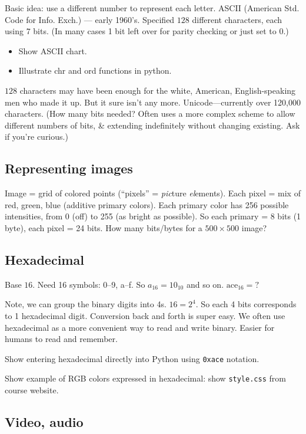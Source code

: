 \documentclass{article}
\begin{document}
Basic idea: use a different number to represent each letter.  ASCII
(American Std. Code for Info. Exch.) --- early 1960's.  Specified
$128$ different characters, each using $7$ bits.  (In many cases 1 bit
left over for parity checking or just set to $0$.)
\begin{itemize}
\item Show ASCII chart.
\item Illustrate chr and ord functions in python.
\end{itemize}
$128$ characters may have been enough for the white, American,
English-speaking men who made it up.  But it sure isn't any more.
Unicode---currently over 120,000 characters. (How many bits needed?
Often uses a more complex scheme to allow different numbers of bits,
\& extending indefinitely without changing existing.  Ask if you're
curious.)

\subsection*{Representing images}

Image = grid of colored points (``pixels'' = \emph{pic}ture
\emph{el}ements).  Each pixel = mix of red, green, blue (additive
primary colors).  Each primary color has 256 possible intensities,
from 0 (off) to 255 (as bright as possible).  So each primary = 8 bits
(1 byte), each pixel = 24 bits.  How many bits/bytes for a $500 \times
500$ image?

\subsection*{Hexadecimal}

Base $16$.  Need 16 symbols: 0--9, a--f. So $a_{16} = 10_{10}$ and so
on. $\mbox{ace}_{16} = ?$

Note, we can group the binary digits into 4s.  $16 = 2^4$.  So each 4
bits corresponds to 1 hexadecimal digit.  Conversion back and forth is
super easy.  We often use hexadecimal as a more convenient way to read
and write binary.  Easier for humans to read and remember.

Show entering hexadecimal directly into Python using \verb|0xace|
notation.

Show example of RGB colors expressed in hexadecimal: show
\verb|style.css| from course website.

\subsection*{Video, audio}
\end{document}
